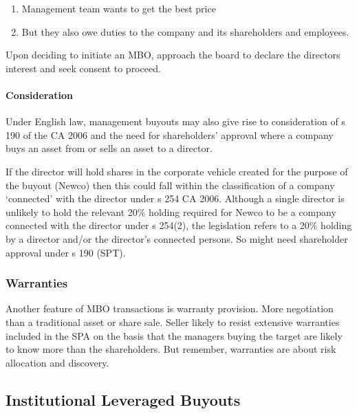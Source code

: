 \documentclass[
]{article}
\newenvironment{Shaded}{}{}
\newcommand{\NormalTok}[1]{#1}
\providecommand{\tightlist}{%
  \setlength{\itemsep}{0pt}\setlength{\parskip}{0pt}}
\begin{document}
\begin{enumerate}
\def\labelenumi{\arabic{enumi}.}
\tightlist
\item
  Management team wants to get the best price
\item
  But they also owe duties to the company and its shareholders and
  employees.
\end{enumerate}

\begin{Shaded}
\begin{Highlighting}[]
\NormalTok{Upon deciding to initiate an MBO, approach the board to declare the director\textquotesingle{}s interest and seek consent to proceed.}
\end{Highlighting}
\end{Shaded}

\hypertarget{consideration}{%
\paragraph{Consideration}\label{consideration}}

Under English law, management buyouts may also give rise to
consideration of s 190 of the CA 2006 and the need for shareholders'
approval where a company buys an asset from or sells an asset to a
director.

If the director will hold shares in the corporate vehicle created for
the purpose of the buyout (Newco) then this could fall within the
classification of a company `connected' with the director under s 254 CA
2006. Although a single director is unlikely to hold the relevant 20\%
holding required for Newco to be a company connected with the director
under s 254(2), the legislation refers to a 20\% holding by a director
and/or the director's connected persons. So might need shareholder
approval under s 190 (SPT).

\hypertarget{warranties}{%
\subsubsection{Warranties}\label{warranties}}

Another feature of MBO transactions is warranty provision. More
negotiation than a traditional asset or share sale. Seller likely to
resist extensive warranties included in the SPA on the basis that the
managers buying the target are likely to know more than the
shareholders. But remember, warranties are about risk allocation and
discovery.

\hypertarget{institutional-leveraged-buyouts}{%
\subsection{Institutional Leveraged
Buyouts}\label{institutional-leveraged-buyouts}}
\end{document}
